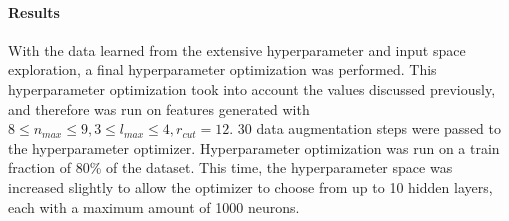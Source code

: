 \paragraph{Results}

With the data learned from the extensive hyperparameter and input space exploration, a final hyperparameter
optimization was performed.
This hyperparameter optimization took into account the values discussed previously, and therefore was run on 
features  generated with $8 \leq n_{max} \leq 9, 3 \leq l_{max} \leq 4, r_{cut}=12$.
30 data augmentation steps were passed to the hyperparameter optimizer.
Hyperparameter optimization was run on a train fraction of 80\% of the dataset.
This time, the hyperparameter space was increased slightly to allow the optimizer
to choose from up to 10 hidden layers, each with a maximum amount of 1000 neurons.


